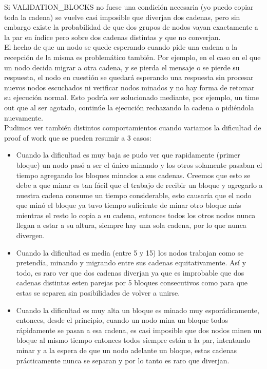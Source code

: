 Si VALIDATION_BLOCKS no fuese una condición necesaria (yo puedo copiar toda la cadena) se vuelve casi imposible que diverjan dos cadenas, pero sin embargo existe la probabilidad de que dos grupos de nodos vayan exactamente a la par en índice pero sobre dos cadenas distintas y que no converjan.
\\
El hecho de que un nodo se quede esperando cuando pide una cadena a la recepción de la misma es problemático también. Por ejemplo, en el caso en el que un nodo decida migrar a otra cadena, y se pierda el mensaje o se pierde su respuesta, el nodo en cuestión se quedará esperando una respuesta sin procesar nuevos nodos escuchados ni verificar nodos minados y no hay forma de retomar su ejecución normal. Esto podría ser solucionado mediante, por ejemplo, un time out que al ser agotado, continúe la ejecución rechazando la cadena o pidiéndola nuevamente.
\\
Pudimos ver también distintos comportamientos cuando variamos la dificultad de proof of work  que se pueden resumir a 3 casos:

\begin{itemize}
    \item Cuando la dificultad es muy baja se pudo ver que rapidamente (primer bloque) un nodo pasó a ser el único minando y los otros solamente pasaban el tiempo agregando los bloques minados a sus cadenas. Creemos que esto se debe a que minar es tan fácil que el trabajo de recibir un bloque y agregarlo a nuestra cadena consume un tiempo considerable, esto causaría que el nodo que minó el bloque ya tuvo tiempo suficiente de minar otro bloque más mientras el resto lo copia a su cadena, entonces todos los otros nodos nunca llegan a estar a su altura, siempre hay una sola cadena, por lo que nunca divergen.
    \item Cuando la dificultad es media (entre 5 y 15) los nodos trabajan como se pretendía, minando y migrando entre sus cadenas equitativamente. Así y todo, es raro ver que dos cadenas diverjan ya que es improbable que dos cadenas distintas esten parejas por 5 bloques consecutivos como para que estas se separen sin posibilidades de volver a unirse.
    \item Cuando la dificultad es muy alta un bloque es minado muy esporádicamente, entonces, desde el principio, cuando un nodo mina un bloque todos rápidamente se pasan a esa cadena, es casi imposible que dos nodos minen un bloque al mismo tiempo entonces todos siempre están a la par, intentando minar y a la espera de que un nodo adelante un bloque, estas cadenas prácticamente nunca se separan y por lo tanto es raro que diverjan.
\end{itemize}

